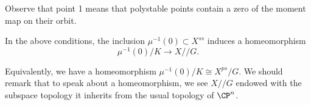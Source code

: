 Observe that point 1 means that polystable points contain a zero of the moment map on their orbit.

\begin{corollary}
    In the above conditions, the inclusion $\mu^{-1}(0) \subset X^{ss}$ induces a homeomorphism
    \[
    \mu^{-1}(0)/K \to X /\!\!/ G.
    \]
\end{corollary}
Equivalently, we have a homeomorphism \(\mu^{-1}(0)/K\cong X^{ps}/G\). We should remark that to speak about a homeomorphism, we see \(X /\!\!/G\) endowed with the subspace topology it inherits from the usual topology of \(\CP^n\).





